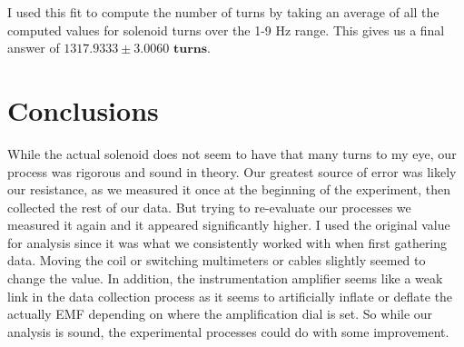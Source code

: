 \documentclass[12pt,letterpaper]{article}
\begin{document}
I used this fit to compute the number of turns by taking an average of all the computed values for solenoid turns over the 1-9 Hz range. This gives us a final answer of $\mathbf{1317.9333 \pm 3.0060} \textbf{ turns}$.

\section{Conclusions}

While the actual solenoid does not seem to have that many turns to my eye, our process was rigorous and sound in theory. Our greatest source of error was likely our resistance, as we measured it once at the beginning of the experiment, then collected the rest of our data. But trying to re-evaluate our processes we measured it again and it appeared significantly higher. I used the original value for analysis since it was what we consistently worked with when first gathering data. Moving the coil or switching multimeters or cables slightly seemed to change the value. In addition, the instrumentation amplifier seems like a weak link in the data collection process as it seems to artificially inflate or deflate the actually EMF depending on where the amplification dial is set. So while our analysis is sound, the experimental processes could do with some improvement.


% 
% 
\end{document}
